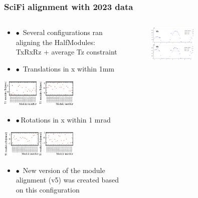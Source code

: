 \documentclass[aspectratio=1610, 12pt, xcolor=dvipsnames]{beamer}
\begin{document}
\begin{frame}\frametitle{SciFi alignment with 2023 data}
  \begin{columns}
    \begin{column}[c]{0.49\textwidth}
      \begin{itemize}
        \item \small $\bullet$\, Several configurations ran aligning the HalfModules: TxRxRz + average Tz constraint
        \item $\bullet$\, Translations in x within 1mm
      \end{itemize}
      \includegraphics[width=0.6\textwidth]{plots/t1tx.png}
      \begin{itemize}
        \item $\bullet$\,Rotations in x within 1 mrad
      \end{itemize}
      \includegraphics[width=0.6\textwidth]{plots/t1rx.png}
      \begin{itemize}
        \item $\bullet$\, New version of the module alignment (v5) was created based on this configuration
      \end{itemize}
    \end{column}
    \begin{column}[c]{0.49\textwidth}
      \begin{figure}
        \includegraphics[width=0.5\textwidth]{plots/phi_v3v5.png}

\end{figure}
\end{column}
\end{columns}
\end{frame}
\end{document}
